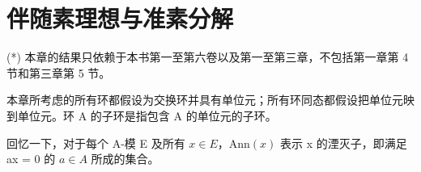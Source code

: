 \chapter{伴随素理想与准素分解}

(*) 本章的结果只依赖于本书第一至第六卷以及第一至第三章，不包括第一章第 4 节和第三章第 5 节。

本章所考虑的所有环都假设为交换环并具有单位元；所有环同态都假设把单位元映到单位元。环 A 的子环是指包含 A 的单位元的子环。

回忆一下，对于每个 A-模 E 及所有 \(x \in E\)，\(\text{Ann}(x)\) 表示 x 的湮灭子，即满足 ax = 0 的 \(a \in A\) 所成的集合。

